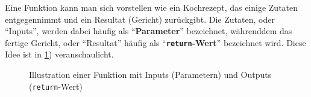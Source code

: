 Eine Funktion kann man sich vorstellen wie ein Kochrezept, das einige Zutaten entgegennimmt und ein Resultat (Gericht) zurückgibt. Die Zutaten, oder \enquote{Inputs}, werden dabei häufig als \enquote{\textbf{Parameter}} bezeichnet, währenddem das fertige Gericht, oder \enquote{Resultat} häufig als \enquote{\textbf{\lstinline|return|-Wert}} bezeichnet wird. Diese Idee ist in \cref{fig:funktion-einzeln}) veranschaulicht.

\begin{figure}[H]
	\centering
	\caption{Illustration einer Funktion mit Inputs (Parametern) und Outputs (\lstinline|return|-Wert)}
	\label{fig:funktion-einzeln}
\end{figure}

